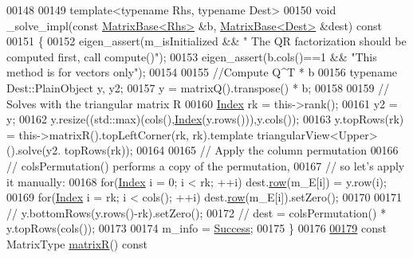\begin{DoxyCode}
00148     
00149     \textcolor{keyword}{template}<\textcolor{keyword}{typename} Rhs, \textcolor{keyword}{typename} Dest>
00150     \textcolor{keywordtype}{void} \_solve\_impl(\textcolor{keyword}{const} \hyperlink{group___core___module_class_eigen_1_1_matrix_base}{MatrixBase<Rhs>} &b, \hyperlink{group___core___module_class_eigen_1_1_matrix_base}{MatrixBase<Dest>} &dest)\textcolor{keyword}{ const}
00151 \textcolor{keyword}{    }\{
00152       eigen\_assert(m\_isInitialized && \textcolor{stringliteral}{" The QR factorization should be computed first, call compute()"});
00153       eigen\_assert(b.cols()==1 && \textcolor{stringliteral}{"This method is for vectors only"});
00154 
00155       \textcolor{comment}{//Compute Q^T * b}
00156       \textcolor{keyword}{typename} Dest::PlainObject y, y2;
00157       y = matrixQ().transpose() * b;
00158       
00159       \textcolor{comment}{// Solves with the triangular matrix R}
00160       \hyperlink{namespace_eigen_a62e77e0933482dafde8fe197d9a2cfde}{Index} rk = this->rank();
00161       y2 = y;
00162       y.resize((std::max)(cols(),\hyperlink{namespace_eigen_a62e77e0933482dafde8fe197d9a2cfde}{Index}(y.rows())),y.cols());
00163       y.topRows(rk) = this->matrixR().topLeftCorner(rk, rk).template triangularView<Upper>().solve(y2.
      topRows(rk));
00164 
00165       \textcolor{comment}{// Apply the column permutation }
00166       \textcolor{comment}{// colsPermutation() performs a copy of the permutation,}
00167       \textcolor{comment}{// so let's apply it manually:}
00168       \textcolor{keywordflow}{for}(\hyperlink{namespace_eigen_a62e77e0933482dafde8fe197d9a2cfde}{Index} i = 0; i < rk; ++i) dest.\hyperlink{group___core___module_a4ea11afe36c7962c706caa93decd1380}{row}(m\_E[i]) = y.row(i);
00169       \textcolor{keywordflow}{for}(\hyperlink{namespace_eigen_a62e77e0933482dafde8fe197d9a2cfde}{Index} i = rk; i < cols(); ++i) dest.\hyperlink{group___core___module_a4ea11afe36c7962c706caa93decd1380}{row}(m\_E[i]).setZero();
00170       
00171 \textcolor{comment}{//       y.bottomRows(y.rows()-rk).setZero();}
00172 \textcolor{comment}{//       dest = colsPermutation() * y.topRows(cols());}
00173       
00174       m\_info = \hyperlink{group__enums_gga85fad7b87587764e5cf6b513a9e0ee5ea52581b035f4b59c203b8ff999ef5fcea}{Success};
00175     \}
00176     
\hyperlink{class_eigen_1_1_s_p_q_r_ad51661be35674dd6a65e27699dbb3fb9}{00179}     \textcolor{keyword}{const} MatrixType \hyperlink{class_eigen_1_1_s_p_q_r_ad51661be35674dd6a65e27699dbb3fb9}{matrixR}()\textcolor{keyword}{ const}

\end{DoxyCode}
